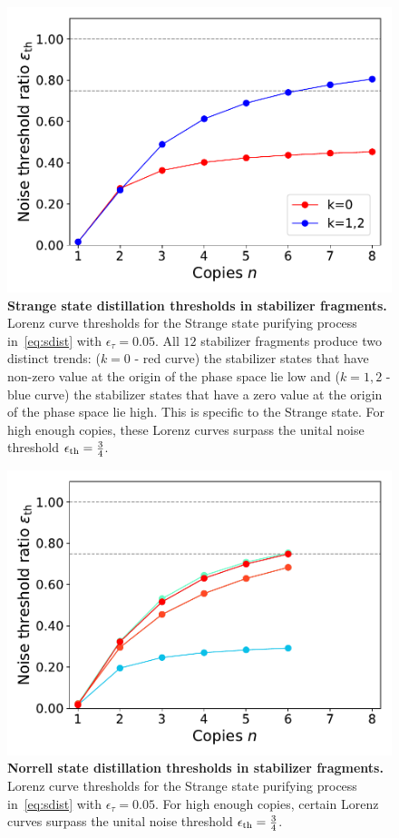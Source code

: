 \documentclass[pra,
aps,
twocolumn,
superscriptaddress,
groupedaddress,
nofootinbib,
reprint
]{revtex4-1}
\begin{document}
\begin{figure}
    \centering
    \includegraphics[scale=0.5]{figs/stab_distill.pdf}
    \caption{\textbf{Strange state distillation thresholds in stabilizer fragments.} Lorenz curve thresholds for the Strange state purifying process in~\cref{eq:sdist} with $\epsilon_\tau = 0.05$.
    All $12$ stabilizer fragments produce two distinct trends: ($k=0$ - red curve) the stabilizer states that have non-zero value at the origin of the phase space lie low and ($k=1,2$ - blue curve) the stabilizer states that have a zero value at the origin of the phase space lie high.
    This is specific to the Strange state.
    For high enough copies, these Lorenz curves surpass the unital noise threshold $\epsilon_{\rm{th}} = \frac{3}{4}$.
    }
    \label{fig:stab_distill}
\end{figure}

\begin{figure}
    \centering
    \includegraphics[scale=0.5]{figs/stab_distill_norrell.pdf}
    \caption{\textbf{Norrell state distillation thresholds in stabilizer fragments.} Lorenz curve thresholds for the Strange state purifying process in~\cref{eq:sdist} with $\epsilon_\tau = 0.05$.
    For high enough copies, certain Lorenz curves surpass the unital noise threshold $\epsilon_{\rm{th}} = \frac{3}{4}$.
    }
    \label{fig:stab_distill_norrell}
\end{figure}
\end{document}
